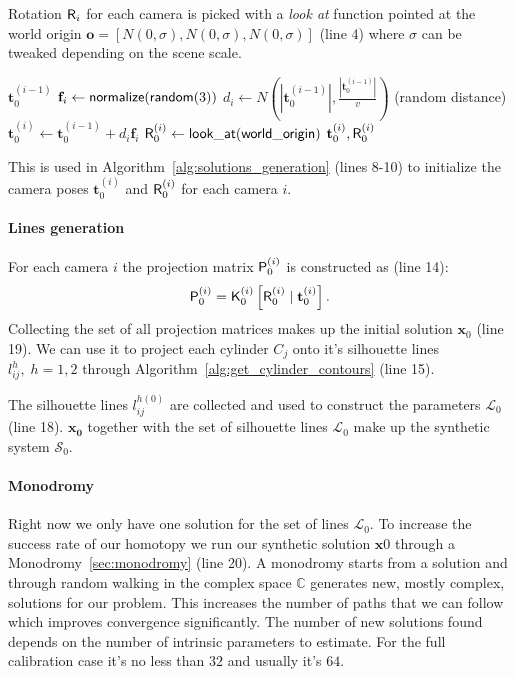 Rotation $\mathsf{R}_i$ for each camera is picked with a \emph{look at} function pointed at the world origin $\mathbf{o} = \left[N(0, \sigma), N(0, \sigma), N(0, \sigma) \right]$ (line 4) where $\sigma$ can be tweaked depending on the scene scale.

\begin{algorithm}
\caption{next\_camera\_pose}
\label{alg:next_camera_pose}
    \begin{algorithmic}[1]
        \REQUIRE $\mathbf{t}_0^{(i-1)}$
        \STATE $\mathbf{f}_i \gets \mathsf{normalize}(\mathsf{random}(3))$
        \STATE $d_i \gets N(|\mathbf{t}_0^{(i-1)}|, \frac{|\mathbf{t}_0^{(i-1)}|}{v})$ \; \; (random distance)
        \STATE $\mathbf{t}_0^{(i)} \gets \mathbf{t}_0^{(i-1)} + d_i \mathbf{f}_i$
        \STATE $\mathsf{R}_0^{(i)} \gets \mathsf{look\_at}(\mathsf{world\_origin})$
        \RETURN $\mathbf{t}_0^{(i)}, \mathsf{R}_0^{(i)}$
    \end{algorithmic}
\end{algorithm}

This is used in Algorithm~\ref{alg:solutions_generation} (lines 8-10) to initialize the camera poses $\mathbf{t}_0^{(i)}$ and $\mathsf{R}_0^{(i)}$ for each camera $i$.

\paragraph{Lines generation}
For each camera $i$ the projection matrix $\mathsf{P}_0^{(i)}$ is constructed as (line 14):
\begin{equation}
    \mathsf{P}_0^{(i)} = \mathsf{K}_0^{(i)} \left[\mathsf{R}_0^{(i)} \;|\; \mathbf{t}_0^{(i)}\right].
\end{equation}
Collecting the set of all projection matrices makes up the initial solution $\mathbf{x}_0$ (line 19).
We can use it to project each cylinder $C_j$ onto it's silhouette lines $l_{ij}^{h}, \; h=1,2$ through Algorithm~\ref{alg:get_cylinder_contours} (line 15).

The silhouette lines $l_{ij}^{h(0)}$ are collected and used to construct the parameters $\mathcal{L}_0$ (line 18).
$\mathbf{x_0}$ together with the set of silhouette lines $\mathcal{L}_0$ make up the synthetic system $\mathcal{S}_0$.

\paragraph{Monodromy}
Right now we only have one solution for the set of lines $\mathcal{L}_0$. To increase the success rate of our homotopy we run our synthetic solution $\mathbf{x}0$ through a Monodromy~\ref{sec:monodromy} (line 20). A monodromy starts from a solution and through random walking in the complex space $\mathbb{C}$ generates new, mostly complex, solutions for our problem. This increases the number of paths that we can follow which improves convergence significantly. The number of new solutions found depends on the number of intrinsic parameters to estimate. For the full calibration case it's no less than $32$ and usually it's $64$.

